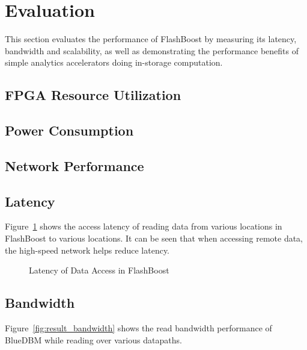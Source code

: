 \section{Evaluation}

This section evaluates the performance of FlashBoost by measuring its latency,
bandwidth and scalability, as well as demonstrating the performance benefits of
simple analytics accelerators doing in-storage computation.

\subsection{FPGA Resource Utilization}

\subsection{Power Consumption}

\subsection{Network Performance}

\subsection{Latency}

Figure~\ref{fig:result_latency} shows the access latency of reading data from
various locations in FlashBoost to various locations. It can be seen that when
accessing remote data, the high-speed network helps reduce latency.

\begin{figure}[h]
	\begin{center}
	\caption{Latency of Data Access in FlashBoost}
	\label{fig:result_latency}
	\end{center}
\end{figure}
%
%


\subsection{Bandwidth}

Figure~\ref{fig:result_bandwidth} shows the read bandwidth performance of
BlueDBM while reading over various datapaths. 

